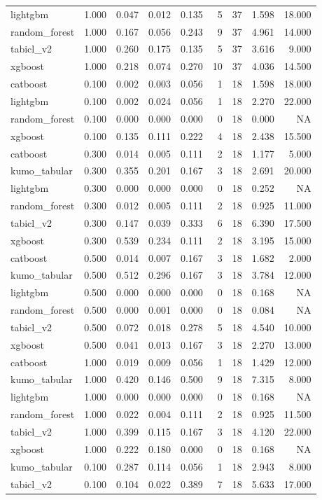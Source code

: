 \begin{table}
\begin{tabular}{lrrrrrrrr}
lightgbm & 1.000 & 0.047 & 0.012 & 0.135 & 5 & 37 & 1.598 & 18.000 \\
random\_forest & 1.000 & 0.167 & 0.056 & 0.243 & 9 & 37 & 4.961 & 14.000 \\
tabicl\_v2 & 1.000 & 0.260 & 0.175 & 0.135 & 5 & 37 & 3.616 & 9.000 \\
xgboost & 1.000 & 0.218 & 0.074 & 0.270 & 10 & 37 & 4.036 & 14.500 \\
catboost & 0.100 & 0.002 & 0.003 & 0.056 & 1 & 18 & 1.598 & 18.000 \\
lightgbm & 0.100 & 0.002 & 0.024 & 0.056 & 1 & 18 & 2.270 & 22.000 \\
random\_forest & 0.100 & 0.000 & 0.000 & 0.000 & 0 & 18 & 0.000 & NA \\
xgboost & 0.100 & 0.135 & 0.111 & 0.222 & 4 & 18 & 2.438 & 15.500 \\
catboost & 0.300 & 0.014 & 0.005 & 0.111 & 2 & 18 & 1.177 & 5.000 \\
kumo\_tabular & 0.300 & 0.355 & 0.201 & 0.167 & 3 & 18 & 2.691 & 20.000 \\
lightgbm & 0.300 & 0.000 & 0.000 & 0.000 & 0 & 18 & 0.252 & NA \\
random\_forest & 0.300 & 0.012 & 0.005 & 0.111 & 2 & 18 & 0.925 & 11.000 \\
tabicl\_v2 & 0.300 & 0.147 & 0.039 & 0.333 & 6 & 18 & 6.390 & 17.500 \\
xgboost & 0.300 & 0.539 & 0.234 & 0.111 & 2 & 18 & 3.195 & 15.000 \\
catboost & 0.500 & 0.014 & 0.007 & 0.167 & 3 & 18 & 1.682 & 2.000 \\
kumo\_tabular & 0.500 & 0.512 & 0.296 & 0.167 & 3 & 18 & 3.784 & 12.000 \\
lightgbm & 0.500 & 0.000 & 0.000 & 0.000 & 0 & 18 & 0.168 & NA \\
random\_forest & 0.500 & 0.000 & 0.001 & 0.000 & 0 & 18 & 0.084 & NA \\
tabicl\_v2 & 0.500 & 0.072 & 0.018 & 0.278 & 5 & 18 & 4.540 & 10.000 \\
xgboost & 0.500 & 0.041 & 0.013 & 0.167 & 3 & 18 & 2.270 & 13.000 \\
catboost & 1.000 & 0.019 & 0.009 & 0.056 & 1 & 18 & 1.429 & 12.000 \\
kumo\_tabular & 1.000 & 0.420 & 0.146 & 0.500 & 9 & 18 & 7.315 & 8.000 \\
lightgbm & 1.000 & 0.000 & 0.000 & 0.000 & 0 & 18 & 0.168 & NA \\
random\_forest & 1.000 & 0.022 & 0.004 & 0.111 & 2 & 18 & 0.925 & 11.500 \\
tabicl\_v2 & 1.000 & 0.399 & 0.115 & 0.167 & 3 & 18 & 4.120 & 22.000 \\
xgboost & 1.000 & 0.222 & 0.180 & 0.000 & 0 & 18 & 0.168 & NA \\
kumo\_tabular & 0.100 & 0.287 & 0.114 & 0.056 & 1 & 18 & 2.943 & 8.000 \\
tabicl\_v2 & 0.100 & 0.104 & 0.022 & 0.389 & 7 & 18 & 5.633 & 17.000 \\
\bottomrule
\end{tabular}
\end{table}
